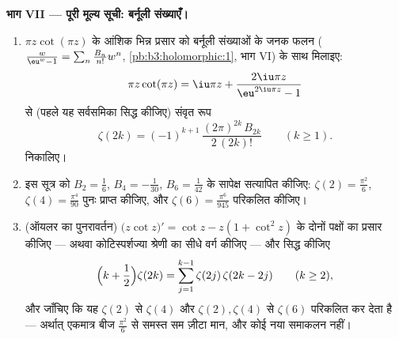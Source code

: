\begin{problem}
\begin{enumerate}[resume]
\end{enumerate}
\medskip
\noindent\textbf{भाग VII --- पूरी मूल्य सूची: बर्नूली
संख्याएँ।}
\begin{enumerate}[resume]
  \item $\pi
        z\cot(\pi z)$ के आंशिक भिन्न प्रसार को बर्नूली संख्याओं के जनक
        फलन ($\frac{w}{\eu^w - 1} =
        \sum_n\frac{B_n}{n!}w^n$, \cref{pb:b3:holomorphic:1}, भाग VI) के साथ मिलाइए: \[
        \pi z\cot(\pi z) = \iu\pi z +
        \frac{2\iu\pi z}{\eu^{2\iu\pi z} - 1}
        \] से (पहले
        यह सर्वसमिका सिद्ध कीजिए) संवृत रूप
        \[
        \zeta(2k) = (-1)^{k+1}\,
        \frac{(2\pi)^{2k}\,B_{2k}}{2\,(2k)!}
        \qquad (k \geq 1).
        \]
        निकालिए।
  \item इस सूत्र को $B_2 = \frac16$, $B_4 =
        -\frac1{30}$, $B_6 = \frac1{42}$ के सापेक्ष सत्यापित कीजिए:
        $\zeta(2) =
        \frac{\pi^2}6$, $\zeta(4) = \frac{\pi^4}{90}$ पुनः प्राप्त कीजिए, और $\zeta(6) = \frac{\pi^6}{945}$ परिकलित कीजिए।
  \item (ऑयलर का पुनरावर्तन) $\bigl(z\cot z\bigr)' = \cot z - z(1 + \cot^2z)$ के दोनों पक्षों का प्रसार
        कीजिए --- अथवा कोटिस्पर्शज्या श्रेणी का सीधे वर्ग कीजिए ---
        और सिद्ध कीजिए
        \[
        \Bigl(k + \frac12\Bigr)\zeta(2k) =
        \sum_{j=1}^{k-1}\zeta(2j)\,\zeta(2k - 2j)
        \qquad (k \geq 2),
        \]
        और जाँचिए कि यह $\zeta(2)$ से $\zeta(4)$ और $\zeta(2), \zeta(4)$ से $\zeta(6)$ परिकलित
        कर देता है --- अर्थात् एकमात्र बीज $\frac{\pi^2}6$ से समस्त सम ज़ीटा
        मान, और कोई नया समाकलन नहीं।
\end{enumerate}
\end{problem}
